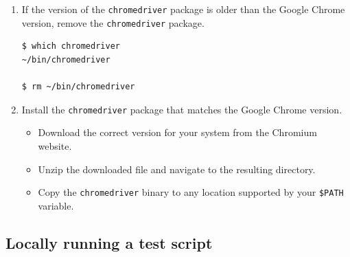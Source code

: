 \documentclass{article}
\begin{document}
\begin{enumerate}
    \item If the version of the \texttt{chromedriver} package is older than the Google Chrome version, remove the \texttt{chromedriver} package.

\begin{lstlisting}[style=bash]
$ which chromedriver
~/bin/chromedriver

$ rm ~/bin/chromedriver
\end{lstlisting}

    \item Install the \texttt{chromedriver} package that matches the Google Chrome version.
    \begin{itemize}
        \item Download the correct version for your system from the Chromium website.
        \item Unzip the downloaded file and navigate to the resulting directory.
        \item Copy the \texttt{chromedriver} binary to any location supported by your \texttt{\$PATH} variable.
    \end{itemize}
\end{enumerate}

\subsection*{Locally running a test script}
\end{document}
